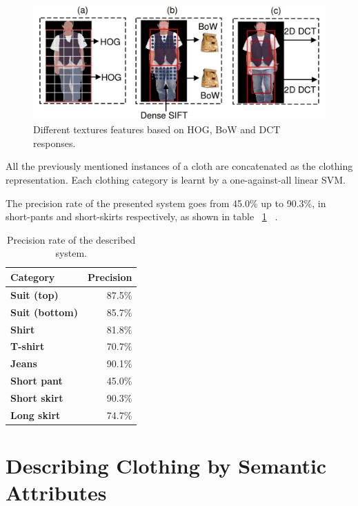 \documentclass[titlepage,12pt,a4paper,times]{book}
\begin{document}
\begin{figure}[!h]
\centering
\includegraphics[scale=0.4]{images/top_bottom.jpg}
\caption{Different textures features based on \ac{HOG}, \ac{BoW} and
\acs{DCT} responses.}
\label{fig:dtf}
\end{figure}
\FloatBarrier

All the previously mentioned instances of a cloth are concatenated as the
clothing representation. Each clothing category is learnt by a
one-against-all linear \ac{SVM}.

The precision rate of the presented system goes from 45.0\% up to 90.3\%,
in short-pants and short-skirts respectively, as shown in table ~\ref{tab:prds}
 ~\citep{1}.

\begin{table}
\centering
\begin{tabular}{|l|r|}
\hline
\textbf{Category} & \textbf{Precision}\\
\hline
\hline
\textbf{Suit (top)} & 87.5\% \\
\hline
\textbf{Suit (bottom)} & 85.7\% \\
\hline
\textbf{Shirt} & 81.8\% \\
\hline
\textbf{T-shirt} & 70.7\% \\
\hline
\textbf{Jeans} & 90.1\% \\
\hline
\textbf{Short pant} & 45.0\% \\
\hline
\textbf{Short skirt} & 90.3\% \\
\hline
\textbf{Long skirt} & 74.7\% \\
\hline
\end{tabular}
\caption{Precision rate of the described system.}
\label{tab:prds}
\end{table}
\FloatBarrier

\section{Describing Clothing by Semantic Attributes}
\label{chap2:sec:art2}
\end{document}
